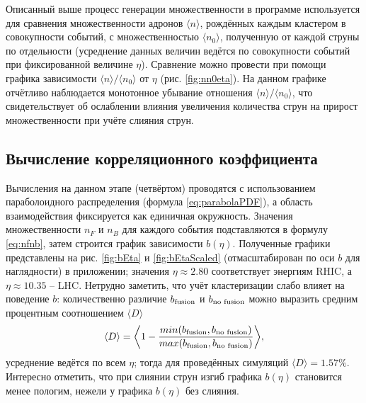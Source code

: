 Описанный выше процесс генерации множественности в программе используется для сравнения множественности адронов $\langle n \rangle$, рождённых каждым кластером в совокупности событий, с множественностью $\langle n_0 \rangle$, полученную от каждой струны по отдельности (усреднение данных величин ведётся по совокупности событий при фиксированной величине $\eta$). Сравнение можно провести при помощи графика зависимости $\langle n \rangle / \langle n_0 \rangle$ от $\eta$ (рис. \ref{fig:nn0eta}). На данном графике отчётливо наблюдается монотонное убывание отношения $\langle n \rangle / \langle n_0 \rangle$, что свидетельствует об ослаблении влияния увеличения количества струн на прирост множественности при учёте слияния струн.
\subsection{Вычисление корреляционного коэффициента}
Вычисления на данном этапе (четвёртом) проводятся с использованием параболоидного распределения (формула \ref{eq:parabolaPDF}), а область взаимодействия фиксируется как единичная окружность. Значения множественности $n_F$ и $n_B$ для каждого события подставляются в формулу \ref{eq:nfnb}, затем строится график зависимости $b(\eta)$. Полученные графики представлены на рис. \ref{fig:bEta} и \ref{fig:bEtaScaled} (отмасштабирован по оси $b$ для наглядности) в приложении; значения $\eta \approx 2.80$ соответствует энергиям RHIC, а $\eta \approx 10.35$ -- LHC. Нетрудно заметить, что учёт кластеризации слабо влияет на поведение $b$: количественно различие $b_{\textnormal{fusion}}$ и $b_{\textnormal{no fusion}}$ можно выразить средним процентным соотношением $\langle D \rangle$ 
\begin{equation} \label{eq:bfbn}
	\langle D \rangle = \bigg \langle 1 - \frac{min(b_{\textnormal{fusion}}, b_{\textnormal{no fusion}})}{max(b_{\textnormal{fusion}}, b_{\textnormal{no fusion}})} \bigg \rangle,
\end{equation}
усреднение ведётся по всем $\eta$; тогда для проведённых симуляций $\langle D \rangle = 1.57 \%$. Интересно отметить, что при слиянии струн изгиб графика $b(\eta)$ становится менее пологим, нежели у графика $b(\eta)$ без слияния.

